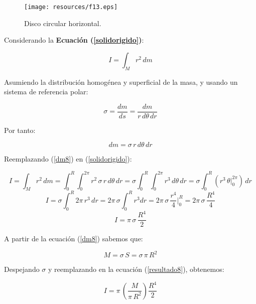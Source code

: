 \documentclass[letter,oneside,11pt]{article}
\begin{document}
\begin{figure}
\centering
\texttt{[image: resources/f13.eps]}
\caption{Disco circular horizontal.}
\label{figura13}
\end{figure}

Considerando la \textbf{Ecuación (\ref{solidorigido})}:

\begin{equation*}
    I = \int_{M} r^2\, dm
\tag{4}
\end{equation*}

Asumiendo la distribución homogénea y superficial de la masa, y usando un
sistema de referencia polar:

\begin{equation*}
    \sigma = \frac{dm}{ds} = \frac{dm}{r\, d\theta\, dr}
\end{equation*}

Por tanto:

\begin{equation}
    dm = \sigma\, r\, d\theta\, dr
\label{dm8}
\end{equation}

Reemplazando (\ref{dm8}) en (\ref{solidorigido}):

\begin{equation*}
    I = \int_{M} r^2\, dm = \int_{0}^{R} \int_{0}^{2\pi} r^2\, \sigma\, r\, d\theta\, dr = \sigma \int_{0}^{R} \int_{0}^{2\pi} r^3\, d\theta\, dr = \sigma \int_{0}^{R} ( r^3\, \theta \Biggr|_{0}^{2\pi} )\, dr
\end{equation*}
\begin{equation*}
    I = \sigma \int_{0}^{R} 2\pi\, r^3\, dr = 2\pi\, \sigma \int_{0}^{R} r^3 dr = 2\pi\, \sigma\, \frac{r^4}{4} \Biggr|_{0}^{R} = 2\pi\, \sigma\, \frac{R^4}{4}
\end{equation*}
\begin{equation}
    I = \pi\, \sigma\, \frac{R^4}{2}
\label{resultado8}
\end{equation}

A partir de la ecuación (\ref{dm8}) sabemos que:

\begin{equation*}
    M = \sigma\, S = \sigma\, \pi\, R^2
\end{equation*}

Despejando $\sigma$ y reemplazando en la ecuación (\ref{resultado8}), obtenemos:

\begin{equation*}
    I = \pi\, \left( \frac{M}{\pi\, R^2} \right) \frac{R^4}{2}
\end{equation*}
\end{document}
